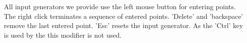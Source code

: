 All input generators we provide use the left mouse button for entering points.
The right click terminates a sequence of entered points. 'Delete' and 'backspace'
remove the last entered point. 'Esc' resets the input generator.  As the 'Ctrl' key
is used by the  this modifier is not used.  


